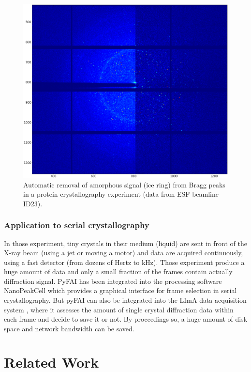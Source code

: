 \documentclass[preprint]{iucr}
\begin{document}
\begin{figure}
\label{separate}
\begin{center}
\includegraphics[width=15cm]{separate_id23.eps}
\caption{Automatic removal of amorphous signal (ice ring) from Bragg peaks in a
protein crystallography experiment (data from ESF beamline ID23).}
\end{center}
\end{figure}

\subsubsection{Application to serial crystallography}
In those experiment, tiny crystals in their medium (liquid) are sent in front of
the X-ray beam (using a jet or moving a motor) and data are acquired
continuously, using a fast detector (from dozens of Hertz to kHz).
Those experiment produce a huge amount of data and only a small fraction of the
frames contain actually diffraction signal.
PyFAI has been integrated into the processing software NanoPeakCell which
provides a graphical interface for frame selection in serial crystallography.
But pyFAI can also be integrated into the LImA data acquisition system
\cite{lima}, where it assesses the amount of single crystal
diffraction data within each frame and decide to save it or not.
By proceedings so, a huge amount of disk space and network bandwidth can be
saved.

\section{Related Work}
\end{document}
